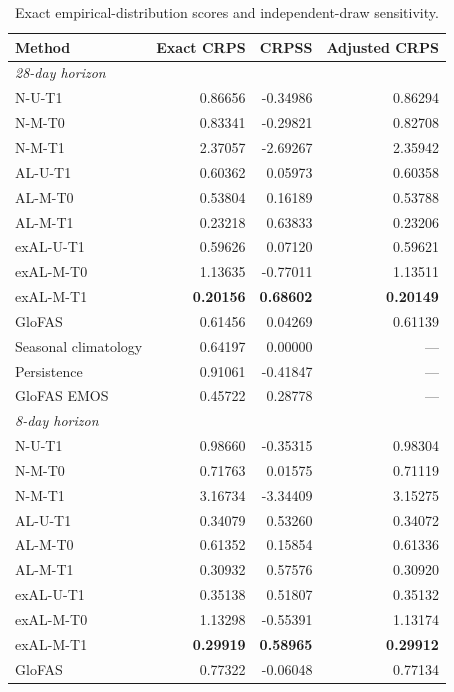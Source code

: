 \begin{table}[!htbp]
\centering
\begin{threeparttable}
\caption{Exact empirical-distribution scores and independent-draw sensitivity.}
\label{tab:exact_score_sensitivity}
\setlength{\tabcolsep}{4pt}
\begin{tabular}{lrrr}
\hline
Method & Exact CRPS & CRPSS & Adjusted CRPS \\
\hline
\multicolumn{4}{l}{\textit{28-day horizon}} \\
N-U-T1 & 0.86656 & -0.34986 & 0.86294 \\
N-M-T0 & 0.83341 & -0.29821 & 0.82708 \\
N-M-T1 & 2.37057 & -2.69267 & 2.35942 \\
AL-U-T1 & 0.60362 & 0.05973 & 0.60358 \\
AL-M-T0 & 0.53804 & 0.16189 & 0.53788 \\
AL-M-T1 & 0.23218 & 0.63833 & 0.23206 \\
exAL-U-T1 & 0.59626 & 0.07120 & 0.59621 \\
exAL-M-T0 & 1.13635 & -0.77011 & 1.13511 \\
exAL-M-T1 & \textbf{0.20156} & \textbf{0.68602} & \textbf{0.20149} \\
GloFAS & 0.61456 & 0.04269 & 0.61139 \\
Seasonal climatology & 0.64197 & 0.00000 & --- \\
Persistence & 0.91061 & -0.41847 & --- \\
GloFAS EMOS & 0.45722 & 0.28778 & --- \\
\hline
\multicolumn{4}{l}{\textit{8-day horizon}} \\
N-U-T1 & 0.98660 & -0.35315 & 0.98304 \\
N-M-T0 & 0.71763 & 0.01575 & 0.71119 \\
N-M-T1 & 3.16734 & -3.34409 & 3.15275 \\
AL-U-T1 & 0.34079 & 0.53260 & 0.34072 \\
AL-M-T0 & 0.61352 & 0.15854 & 0.61336 \\
AL-M-T1 & 0.30932 & 0.57576 & 0.30920 \\
exAL-U-T1 & 0.35138 & 0.51807 & 0.35132 \\
exAL-M-T0 & 1.13298 & -0.55391 & 1.13174 \\
exAL-M-T1 & \textbf{0.29919} & \textbf{0.58965} & \textbf{0.29912} \\
GloFAS & 0.77322 & -0.06048 & 0.77134 \\

\end{tabular}
\end{threeparttable}
\end{table}
